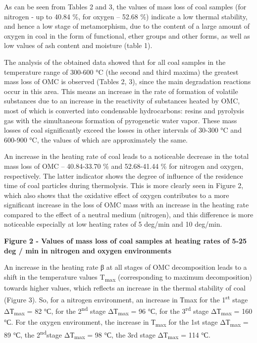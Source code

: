 As can be seen from Tables 2 and 3, the values of mass loss of coal
samples (for nitrogen - up to 40.84 \%, for oxygen -- 52.68 \%) indicate
a low thermal stability, and hence a low stage of metamorphism, due to
the content of a large amount of oxygen in coal in the form of
functional, ether groups and other forms, as well as low values of ash
content and moisture (table 1).

The analysis of the obtained data showed that for all coal samples in
the temperature range of 300-600 °C (the second and third maxima) the
greatest mass loss of OMC is observed (Tables 2, 3), since the main
degradation reactions occur in this area. This means an increase in the
rate of formation of volatile substances due to an increase in the
reactivity of substances heated by OMC, most of which is converted into
condensable hydrocarbons: resins and pyrolysis gas with the simultaneous
formation of pyrogenetic water vapor. These mass losses of coal
significantly exceed the losses in other intervals of 30-300 °C and
600-900 °C, the values of which are approximately the same.

An increase in the heating rate of coal leads to a noticeable decrease
in the total mass loss of OMC -- 40.84-33.70 \% and 52.68-41.44 \% for
nitrogen and oxygen, respectively. The latter indicator shows the degree
of influence of the residence time of coal particles during thermolysis.
This is more clearly seen in Figure 2, which also shows that the
oxidative effect of oxygen contributes to a more significant increase in
the loss of OMC mass with an increase in the heating rate compared to
the effect of a neutral medium (nitrogen), and this difference is more
noticeable especially at low heating rates of 5 deg/min and 10 deg/min.

{\bfseries Figure 2 - Values of mass loss of coal samples at heating rates
of 5-25 deg / min in nitrogen and oxygen environments}

An increase in the heating rate β at all stages of OMC decomposition
leads to a shift in the temperature values T\textsubscript{max}
(corresponding to maximum decomposition) towards higher values, which
reflects an increase in the thermal stability of coal (Figure 3). So,
for a nitrogen environment, an increase in Тmax for the
1\textsuperscript{st} stage ΔТ\textsubscript{max} = 82 °С, for the
2\textsuperscript{nd} stage ΔТ\textsubscript{max} = 96 °С, for the
3\textsuperscript{rd} stage ΔТ\textsubscript{max} = 160 °С. For the
oxygen environment, the increase in Т\textsubscript{max} for the 1st
stage ΔТ\textsubscript{max} = 89 °С, the 2\textsuperscript{nd}stage
ΔТ\textsubscript{max} = 98 °С, the 3rd stage ΔТ\textsubscript{max} = 114
°С.

